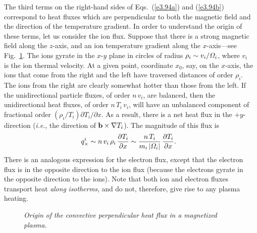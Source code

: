 The third terms on the right-hand sides of  Eqs.~(\ref{e3.94a}) and (\ref{e3.94b})
correspond to heat fluxes which are perpendicular to both the magnetic field
and the direction of the temperature gradient. In order to understand the
origin of these terms, let us consider the ion flux. Suppose that there
is a strong magnetic field along the $z$-axis, and an ion temperature gradient
along the $x$-axis---see Fig.~\ref{f8}. The ions gyrate in the $x$-$y$ plane
in circles of radius $\rho_i\sim v_i/{\mit\Omega}_i$, where $v_i$ is the
ion thermal velocity. At a given point, coordinate $x_0$, say, on the $x$-axis,
the ions that come from the right and the left have traversed distances of
order $\rho_i$. The ions from the right are clearly somewhat hotter than those
from the left. If the unidirectional particle fluxes, of order $n\,v_i$, are
balanced, then the unidirectional heat fluxes, of order $n\,T_i\,v_i$, will
have an unbalanced component of fractional order $(\rho_i/T_i)\partial
T_i/\partial x$. As a result, there is a net heat flux in the $+y$-direction
({\em i.e.}, the direction of ${\bf b}\times\nabla T_i$). The magnitude of
this flux is
\begin{equation}
 q_\times^i \sim n\,v_i\, \rho_i\,\frac{\partial T_i}{\partial x}
\sim \frac{n\,T_i}{m_i\,|{\mit\Omega}_i|}\,\frac{\partial T_i}{\partial x}.
\end{equation}
There is an analogous expression for the electron flux, except that the electron
flux is in the opposite direction 
to the ion flux (because the electrons gyrate in the opposite
direction to the ions). Note that both ion and electron fluxes transport
heat  {\em along isotherms}, and do not, therefore, give rise to
any plasma heating. 

\begin{figure}
\epsfysize=3in
\centerline{}
\caption{\em Origin of the convective  perpendicular heat flux in a magnetized plasma.}\label{f8}
\end{figure}

